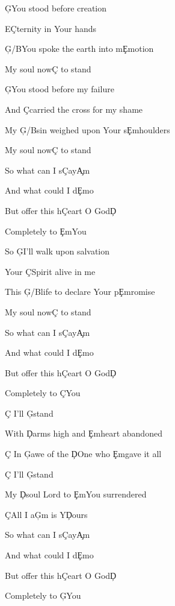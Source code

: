 \documentclass[9pt]{extarticle}
\begin{document}
\bsong

\bv
\c{G}You stood before creation

E\c{C}ternity in Your hands

\c{G/B}You spoke the earth into m\c{Em}otion

My soul now\c{C} to stand
\ev

\bv
\c{G}You stood before my failure

And \c{C}carried the cross for my shame

My \c{G/B}sin weighed upon Your s\c{Em}houlders

My soul now\c{C} to stand
\ev

\bp
So what can I s\c{C}ay\c{Am}

And what could I d\c{Em}o

But offer this h\c{C}eart O God\c{D}

Completely to \c{Em}You
\ep

\bv
So \c{G}I'll walk upon salvation

Your \c{C}Spirit alive in me

This \c{G/B}life to declare Your p\c{Em}romise

My soul now\c{C} to stand
\ev


\bp
So what can I s\c{C}ay\c{Am}

And what could I d\c{Em}o

But offer this h\c{C}eart O God\c{D}

Completely to \c{C}You
\ep

\bc
\c{C} I'll \c{G}stand

With \c{D}arms high and \c{Em}heart abandoned

\c{C} In \c{G}awe of the \c{D}One who \c{Em}gave it all

\c{C} I'll \c{G}stand

My \c{D}soul Lord to \c{Em}You surrendered

\c{C}All I a\c{G}m is Y\c{D}ours
\ec

\bp
So what can I s\c{C}ay\c{Am}

And what could I d\c{Em}o

But offer this h\c{C}eart O God\c{D}

Completely to \c{G}You
\ep

\esong
\end{document}
